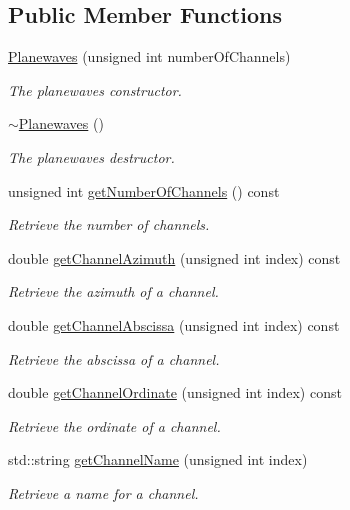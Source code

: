 \subsection*{Public Member Functions}
\begin{DoxyCompactItemize}
\item 
\hyperlink{class_hoa2_d_1_1_planewaves_ab233faf82900c5695b926214d6bbfff6}{Planewaves} (unsigned int number\-Of\-Channels)
\begin{DoxyCompactList}\small\item\em The planewaves constructor. \end{DoxyCompactList}\item 
\hyperlink{class_hoa2_d_1_1_planewaves_a7d13cc39051ae75f2af522651a1305bf}{$\sim$\-Planewaves} ()
\begin{DoxyCompactList}\small\item\em The planewaves destructor. \end{DoxyCompactList}\item 
unsigned int \hyperlink{class_hoa2_d_1_1_planewaves_a4bf0de6ae4ac7ac03fc552d477237a85}{get\-Number\-Of\-Channels} () const 
\begin{DoxyCompactList}\small\item\em Retrieve the number of channels. \end{DoxyCompactList}\item 
double \hyperlink{class_hoa2_d_1_1_planewaves_a52c4f8b05137ab56e82b0e076d7f5d3a}{get\-Channel\-Azimuth} (unsigned int index) const 
\begin{DoxyCompactList}\small\item\em Retrieve the azimuth of a channel. \end{DoxyCompactList}\item 
double \hyperlink{class_hoa2_d_1_1_planewaves_aab20597fa76482d7a907b2e39cc5be25}{get\-Channel\-Abscissa} (unsigned int index) const 
\begin{DoxyCompactList}\small\item\em Retrieve the abscissa of a channel. \end{DoxyCompactList}\item 
double \hyperlink{class_hoa2_d_1_1_planewaves_ade9d19725af0826e02b43bcf10a4bc73}{get\-Channel\-Ordinate} (unsigned int index) const 
\begin{DoxyCompactList}\small\item\em Retrieve the ordinate of a channel. \end{DoxyCompactList}\item 
std\-::string \hyperlink{class_hoa2_d_1_1_planewaves_a66b40a511ac3dd9f3ab1102e98370dbd}{get\-Channel\-Name} (unsigned int index)
\begin{DoxyCompactList}\small\item\em Retrieve a name for a channel. \end{DoxyCompactList}\end{DoxyCompactItemize}
